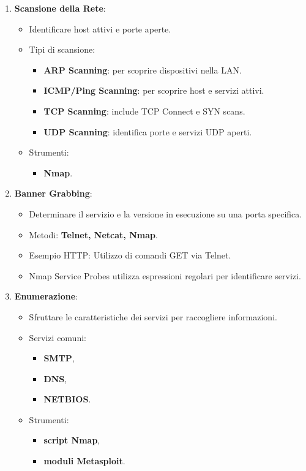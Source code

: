 \documentclass[12pt]{article}
\begin{document}
\begin{enumerate}
\begin{enumerate}
        \item \textbf{Scansione della Rete}:
        \begin{itemize}
            \item Identificare host attivi e porte aperte.
            \item Tipi di scansione:
            \begin{itemize}
                \item \textbf{ARP Scanning}: per scoprire dispositivi nella LAN.
                \item \textbf{ICMP/Ping Scanning}: per scoprire host e servizi attivi.
                \item \textbf{TCP Scanning}: include TCP Connect e SYN scans.
                \item \textbf{UDP Scanning}: identifica porte e servizi UDP aperti. 
            \end{itemize}
            \item Strumenti:
            \begin{itemize}
                \item \textbf{Nmap}.
            \end{itemize} 
        \end{itemize}
        \item \textbf{Banner Grabbing}:
        \begin{itemize}
            \item Determinare il servizio e la versione in esecuzione su una 
            porta specifica.
            \item Metodi: \textbf{Telnet, Netcat, Nmap}.
            \item Esempio HTTP: Utilizzo di comandi GET via Telnet.
            \item Nmap Service Probes utilizza espressioni regolari per 
            identificare servizi.
        \end{itemize}
        \item \textbf{Enumerazione}:
        \begin{itemize}
            \item Sfruttare le caratteristiche dei servizi per raccogliere 
            informazioni.
            \item Servizi comuni: 
            \begin{itemize}
                \item \textbf{SMTP},
                \item \textbf{DNS},
                \item \textbf{NETBIOS}.
            \end{itemize}
            \item Strumenti: 
            \begin{itemize}
                \item \textbf{script Nmap},
                \item \textbf{moduli Metasploit}.
            \end{itemize}
        \end{itemize}
        

\end{enumerate}
\end{enumerate}
\end{document}
